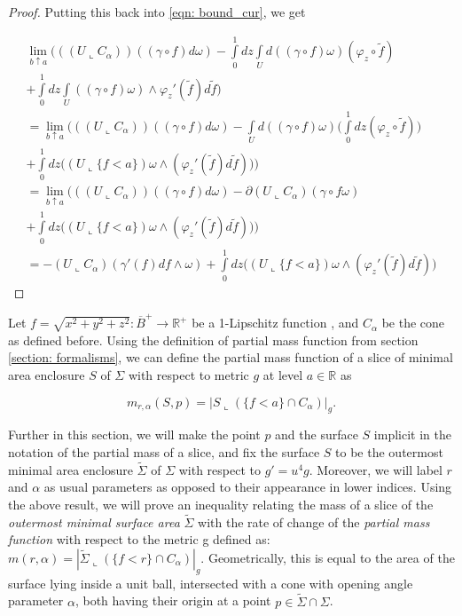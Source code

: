 \documentclass{amsart}
\newcommand{\ts}{\tilde{\Sigma}}
\newcommand{\s}{\Sigma}
\theoremstyle{named}
\begin{document}
\begin{proof}
    Putting this back into \ref{eqn: bound_cur}, we get
    
    \begin{gather*}
        \lim\limits_{b \uparrow a} \bigg( ((U \llcorner C_{\alpha}))((\gamma \circ f)d\omega) - \int\limits_{0}^{1} dz \int\limits_{U}d((\gamma \circ f)\omega)(\varphi_z \circ \tilde{f}) \\ + \int\limits_{0}^{1} dz \int\limits_{U} ((\gamma \circ f)\omega) \wedge \varphi_{z}'(\tilde{f})d\tilde{f}  
        \bigg) \\
        = \lim\limits_{b \uparrow a} \bigg( ((U \llcorner C_{\alpha}))((\gamma \circ f)d\omega) - \int\limits_{U} d((\gamma \circ f)\omega) \Big( \int\limits_{0}^{1} dz (\varphi_z \circ \tilde{f}) \Big) \\  + \int\limits_{0}^{1} dz \Big( (U \llcorner \{ f < a \}) \omega \wedge (\varphi_{z}'(\tilde{f})d\tilde{f}) \Big)
        \bigg) \\
        = \lim\limits_{b \uparrow a} \bigg( ((U \llcorner C_{\alpha}))((\gamma \circ f)d\omega) 
        - \partial (U \llcorner C_{\alpha}) (\gamma \circ f\omega) \\  
        + \int\limits_{0}^{1} dz \Big( (U \llcorner \{ f < a \}) \omega \wedge (\varphi_{z}'(\tilde{f})d\tilde{f}) \Big)
        \bigg) \\
        = - (U \llcorner C_{\alpha})(\gamma'(f)df \wedge \omega) + \int\limits_{0}^{1} dz \Big( (U \llcorner \{ f < a \}) \omega \wedge (\varphi_{z}'(\tilde{f})d\tilde{f}) \Big)
    \end{gather*}
    
\end{proof} 


Let $f = \sqrt{x^2 + y^2 + z^2} : \overline{B}^{+} \rightarrow \mathbb{R}^{+}$ be a 1-Lipschitz function , and $C_{\alpha}$ be the cone as defined before. Using the definition of partial mass function from section \ref{section: formalisms}, we can define the partial mass function of a slice of minimal area enclosure $S$ of $\Sigma$ with respect to metric $g$ at level $a \in \mathbb{R}$ as 

\begin{equation} \nonumber
    m_{r,\alpha}(S,p) = |S \llcorner (\{ f < a \} \cap C_{\alpha})|_g.
\end{equation}

Further in this section, we will make the point $p$ and the surface $S$ implicit in the notation of the partial mass of a slice, and fix the surface $S$ to be the outermost minimal area enclosure $\ts$ of $\s$ with respect to $g' = u^4 g$. Moreover, we will label $r$ and $\alpha$ as usual parameters as opposed to their appearance in lower indices. Using the above result, we will prove an inequality relating the mass of a slice of the \textit{outermost minimal surface area} $\tilde{\Sigma}$ with the rate of change of the \textit{partial mass function} with respect to the metric g defined as: $m(r,\alpha) = |\tilde{\Sigma} \llcorner (\{ f < r \} \cap C_{\alpha})|_g$. Geometrically, this is equal to the area of the surface lying inside a unit ball, intersected with a cone with opening angle parameter $\alpha$, both having their origin at a point $p \in \ts \cap \s$.
\end{document}
